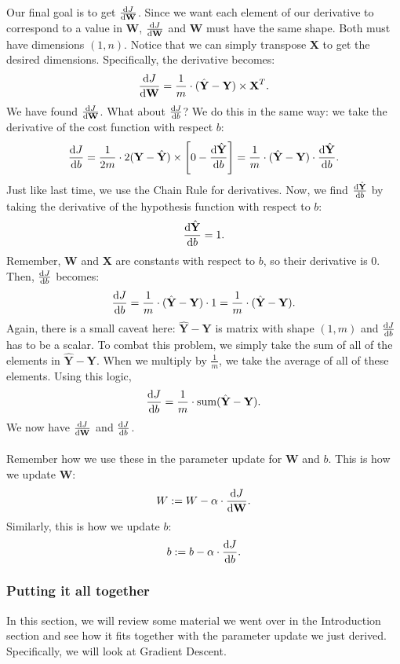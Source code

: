 \documentclass{article}
\begin{document}
\\
Our final goal is to get $\diff{J}{\textbf{W}}$. Since we want each element of our derivative to correspond to a value in \textbf{W}, $\diff{J}{\textbf{W}}$ and \textbf{W} must have the same shape. Both must have dimensions $(1,n)$. Notice that we can simply transpose \textbf{X} to get the desired dimensions. Specifically, the derivative becomes: 
\[\diff{J}{\textbf{W}}=\frac{1}{m}\cdot (\hat{\textbf{Y}}-\textbf{Y})\times \textbf{X}^T.\]
We have found $\diff{J}{\textbf{W}}$. What about $\diff{J}{b}$? We do this in the same way: we take the derivative of the cost function with respect $b$:
\[\diff{J}{b}=\frac{1}{2m}\cdot 2(\textbf{Y}-\hat{\textbf{Y}})\times \left[0-\diff{\hat{\textbf{Y}}}{b}\right]=\frac{1}{m}\cdot (\hat{\textbf{Y}}-\textbf{Y})\cdot \diff{\hat{\textbf{Y}}}{b}.\]
Just like last time, we use the Chain Rule for derivatives. Now, we find $\diff{\hat{\textbf{Y}}}{b}$ by taking the derivative of the hypothesis function with respect to $b$:
\[\diff{\hat{\textbf{Y}}}{b}=1.\]
Remember, \textbf{W} and \textbf{X} are constants with respect to $b$, so their derivative is 0. Then, $\diff{J}{b}$ becomes:
\[\diff{J}{b}=\frac{1}{m}\cdot (\hat{\textbf{Y}}-\textbf{Y})\cdot 1=\frac{1}{m}\cdot (\hat{\textbf{Y}}-\textbf{Y}).\]
Again, there is a small caveat here: $\hat{\textbf{Y}}-\textbf{Y}$ is  matrix with shape $(1,m)$ and $\diff{J}{b}$ has to be a scalar. To combat this problem, we simply take the sum of all of the elements in $\hat{\textbf{Y}}-\textbf{Y}$. When we multiply by $\frac{1}{m}$, we take the average of all of these elements. Using this logic, 
\[\diff{J}{b}=\frac{1}{m}\cdot \text{sum}(\hat{\textbf{Y}}-\textbf{Y}).\]
We now have $\diff{J}{\textbf{W}}$ and $\diff{J}{b}$. 
\\
\\
Remember how we use these in the parameter update for \textbf{W} and $b$. This is how we update \textbf{W}:
\[W:=W-\alpha\cdot \diff{J}{\textbf{W}}.\]
Similarly, this is how we update $b$:
\[b:=b-\alpha\cdot \diff{J}{b}.\]

\subsubsection{Putting it all together}
In this section, we will review some material we went over in the Introduction section and see how it fits together with the parameter update we just derived. Specifically, we will look at Gradient Descent.
\end{document}

